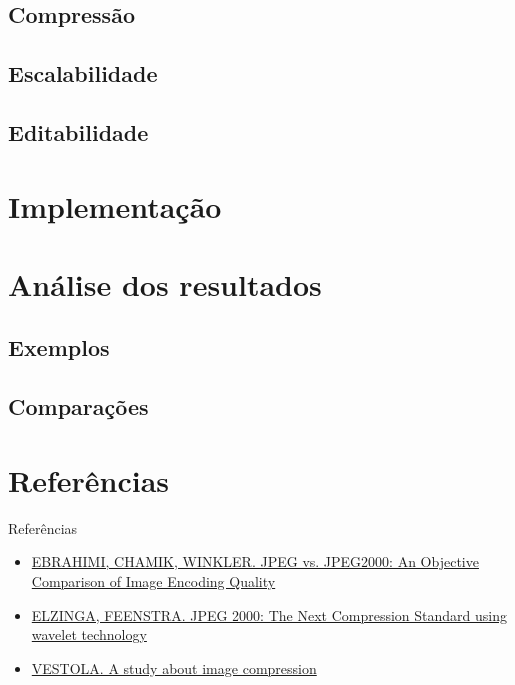 \documentclass{beamer}
\begin{document}
\subsection{Compressão}
\subsection{Escalabilidade}
\subsection{Editabilidade}
\section{Implementação}
\section{Análise dos resultados}
\subsection{Exemplos}
\subsection{Comparações}
\section{Referências}
\begin{frame}{Referências}
   \begin{itemize}
      \item \href{http://stefan.winklerbros.net/Publications/adip2004.pdf}{EBRAHIMI, CHAMIK, WINKLER. JPEG vs. JPEG2000: An Objective Comparison of Image Encoding Quality}
      \item \href{http://faculty.gvsu.edu/aboufade/web/wavelets/student_work/EF/}{ELZINGA, FEENSTRA. JPEG 2000: The Next Compression Standard using wavelet technology}
      \item \href{http://www.mvnet.fi/index.php?osio=Tutkielmat&luokka=Yliopisto&sivu=Image_compression}{VESTOLA. A study about image compression}
   \end{itemize}
\end{frame}
\end{document}
